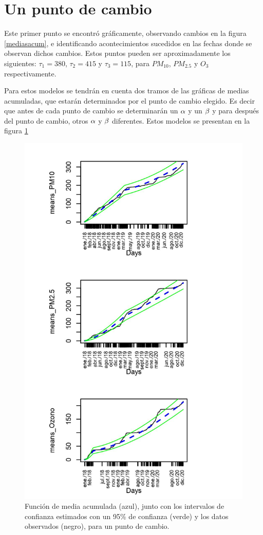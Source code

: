 \newpage


\section{Un punto de cambio}
 

Este primer punto se encontró gráficamente, observando cambios en la figura \ref{mediasacum}, e identificando acontecimientos sucedidos en las fechas donde se observan dichos cambios. Estos puntos pueden ser aproximadamente los siguientes: 
$\tau_1=380$, $\tau_2=415$ y $\tau_3=115$, para $PM_{10}$, $PM_{2.5}$ y $O_3$ respectivamente.  



Para estos modelos se tendrán en cuenta dos tramos de las gráficas de medias acumuladas, que estarán determinados por el punto de cambio elegido. Es decir que antes de cada punto de cambio se determinarán un $\alpha$ y un $\beta$ y para después del punto de cambio, otros $\alpha$ y $\beta$ diferentes. Estos modelos se presentan en la figura \ref{mediasacumupc}

\begin{figure}[h!]
\begin{center}
\includegraphics[width=12cm]{means_updc}
\end{center}
\centering
\caption{ Función de media acumulada (azul), junto con los intervalos de confianza estimados con un 95\% de confianza (verde) y los datos observados (negro), para un punto de cambio.  }
\label{mediasacumupc}
\end{figure}


